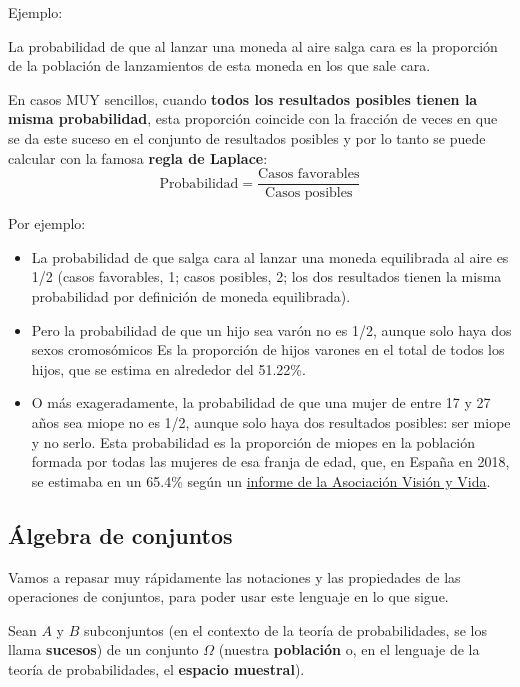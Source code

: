 \documentclass[
  spanish,
  letterpaper,
  DIV=11,
  numbers=noendperiod]{scrreprt}
\begin{document}
\begin{tcolorbox}
Ejemplo:

La probabilidad de que al lanzar una moneda al aire salga cara es la
proporción de la población de lanzamientos de esta moneda en los que
sale cara.

En casos MUY sencillos, cuando \textbf{todos los resultados posibles
tienen la misma probabilidad}, esta proporción coincide con la fracción
de veces en que se da este suceso en el conjunto de resultados posibles
y por lo tanto se puede calcular con la famosa \textbf{regla de
Laplace}: \[
\text{Probabilidad}=\frac{\text{Casos favorables}}{\text{Casos posibles}}
\]

Por ejemplo:

\begin{itemize}
\item
  La probabilidad de que salga cara al lanzar una moneda equilibrada al
  aire es 1/2 (casos favorables, 1; casos posibles, 2; los dos
  resultados tienen la misma probabilidad por definición de moneda
  equilibrada).
\item
  Pero la probabilidad de que un hijo sea varón no es 1/2, aunque solo
  haya dos sexos cromosómicos Es la proporción de hijos varones en el
  total de todos los hijos, que se estima en alrededor del 51.22\%.
\item
  O más exageradamente, la probabilidad de que una mujer de entre 17 y
  27 años sea miope no es 1/2, aunque solo haya dos resultados posibles:
  ser miope y no serlo. Esta probabilidad es la proporción de miopes en
  la población formada por todas las mujeres de esa franja de edad, que,
  en España en 2018, se estimaba en un 65.4\% según un
  \href{http://visionyvida.org/informe-prevalencia-de-la-miopia-en-los-jovenes-en-espana-2018/}{informe
  de la Asociación Visión y Vida}.
\end{itemize}

\subsection{Álgebra de conjuntos}\label{uxe1lgebra-de-conjuntos}

Vamos a repasar muy rápidamente las notaciones y las propiedades de las
operaciones de conjuntos, para poder usar este lenguaje en lo que sigue.

Sean \(A\) y \(B\) subconjuntos (en el contexto de la teoría de
probabilidades, se los llama \textbf{sucesos}) de un conjunto \(\Omega\)
(nuestra \textbf{población} o, en el lenguaje de la teoría de
probabilidades, el \textbf{espacio muestral}).


\end{tcolorbox}
\end{document}
